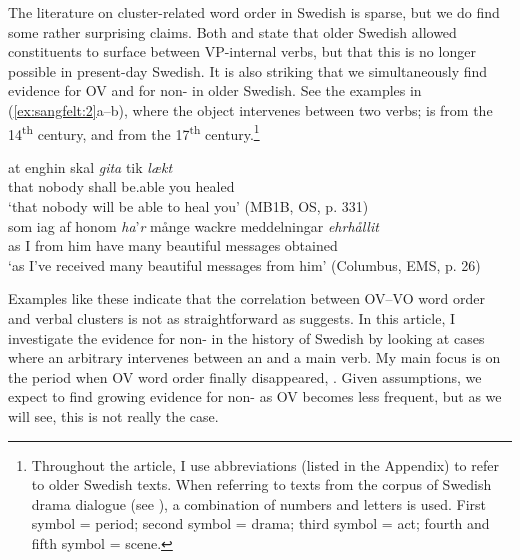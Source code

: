 \documentclass[output=paper, colorlinks, citecolor=brown]{langscibook}
\begin{document}
The literature on cluster-related word order in Swedish is sparse, but we do find some rather surprising claims. Both \citet[171–172]{Falk1993} and \citet[157]{Petzell2011} state that older Swedish allowed constituents to surface between VP-internal verbs, but that this is no longer possible in present-day Swedish. It is also striking that we simultaneously find evidence for OV and for non- in older Swedish. See the examples in (\ref{ex:sangfelt:2}a–b), where the object intervenes between two verbs;  is from the 14\textsuperscript{th} century, and  from the 17\textsuperscript{th} century.\footnote{Throughout the article, I use abbreviations (listed in the Appendix) to refer to older Swedish texts. When referring to texts from the corpus of Swedish drama dialogue (see ), a combination of numbers and letters is used. First symbol = period; second symbol = drama; third symbol = act; fourth and fifth symbol = scene.}


\ea
\label{ex:sangfelt:2}
\ea\label{ex:sangfelt:2a}
\gll at enghin skal \textit{gita} {tik} \textit{lækt} \\
that nobody shall be.able you healed\\
\glt ‘that nobody will be able to heal you’ (MB1B, OS, p. 331)\\

\ex \label{ex:sangfelt:2b}
\gll som iag af honom \textit{ha}’\textit{r} {månge} {wackre} {meddelningar} \textit{ehrhållit}\\
 as I from him have many beautiful messages obtained \\
\glt ‘as I’ve received many beautiful messages from him’ (Columbus, EMS, p. 26)\\
\z
\z


Examples like these indicate that the correlation between OV–VO word order and verbal clusters is not as straightforward as \citet{Haider2010} suggests. In this article, I investigate the evidence for non- in the history of Swedish by looking at cases where an arbitrary  intervenes between an  and a main verb. My main focus is on the period when OV word order finally disappeared, . Given  assumptions, we expect to find growing evidence for non- as OV becomes less frequent, but as we will see, this is not really the case.
\end{document}
